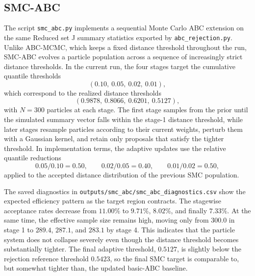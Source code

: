 \documentclass[11pt]{article}
\begin{document}
\subsection{SMC-ABC}

The script \texttt{smc\_abc.py} implements a sequential Monte Carlo ABC extension on the same Reduced set J summary statistics exported by \texttt{abc\_rejection.py}. Unlike ABC-MCMC, which keeps a fixed distance threshold throughout the run, SMC-ABC evolves a particle population across a sequence of increasingly strict distance thresholds. In the current run, the four stages target the cumulative quantile thresholds
\[
(0.10,\ 0.05,\ 0.02,\ 0.01),
\]
which correspond to the realized distance thresholds
\[
(0.9878,\ 0.8066,\ 0.6201,\ 0.5127),
\]
with $N=300$ particles at each stage. The first stage samples from the prior until the simulated summary vector falls within the stage-1 distance threshold, while later stages resample particles according to their current weights, perturb them with a Gaussian kernel, and retain only proposals that satisfy the tighter threshold. In implementation terms, the adaptive updates use the relative quantile reductions
\[
0.05/0.10 = 0.50, \qquad 0.02/0.05 = 0.40, \qquad 0.01/0.02 = 0.50,
\]
applied to the accepted distance distribution of the previous SMC population.

The saved diagnostics in \texttt{outputs/smc\_abc/smc\_abc\_diagnostics.csv} show the expected efficiency pattern as the target region contracts. The stagewise acceptance rates decrease from $11.00\%$ to $9.71\%$, $8.02\%$, and finally $7.33\%$. At the same time, the effective sample size remains high, moving only from $300.0$ in stage 1 to $289.4$, $287.1$, and $283.1$ by stage 4. This indicates that the particle system does not collapse severely even though the distance threshold becomes substantially tighter. The final adaptive threshold, $0.5127$, is slightly below the rejection reference threshold $0.5423$, so the final SMC target is comparable to, but somewhat tighter than, the updated basic-ABC baseline.
\end{document}
